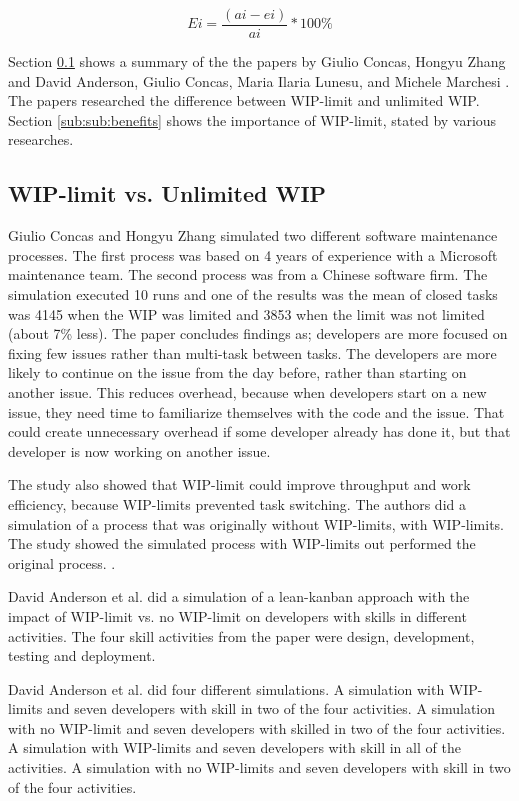 \documentclass[UKenglish]{ifimaster}  %
\begin{document}
\begin{equation} \label{WIPEQ}
Ei=\frac{(ai-ei)}{ai}*100\%
\end{equation}

Section \ref{sub:wip:vs:wip} shows a summary of the the papers by Giulio Concas, Hongyu Zhang \parencite{SMR:SMR1599}  and David Anderson, Giulio Concas, Maria Ilaria Lunesu, and Michele Marchesi \parencite{DavidAnderson}. The papers researched the difference between WIP-limit and unlimited WIP. Section \ref{sub:sub:benefits} shows the importance of WIP-limit, stated by various researches. 

\subsection {WIP-limit vs. Unlimited WIP}
\label{sub:wip:vs:wip}
Giulio Concas and Hongyu Zhang \parencite{SMR:SMR1599} simulated two different software maintenance processes. The first process was based on 4 years of experience with a Microsoft maintenance team. The second process was from a Chinese software firm.  The simulation executed 10 runs and one of the results was the mean of closed tasks was 4145 when the WIP was limited and 3853 when the limit was not limited (about 7\% less). The paper concludes findings as; developers are more focused on fixing few issues rather than multi-task between tasks. The developers are more likely to continue on the issue from the day before, rather than starting on another issue. This reduces overhead, because when developers start on a new issue, they need time to familiarize themselves with the code and the issue. That could create unnecessary overhead if some developer already has done it, but that developer is now working on another issue. 

The study also showed that WIP-limit could improve throughput and work efficiency, because WIP-limits prevented task switching. The authors did a simulation of a process that was originally without WIP-limits, with WIP-limits. The study showed the simulated process with WIP-limits out performed the original process. \parencite{SMR:SMR1599}.

David Anderson et al. \parencite{DavidAnderson} did a simulation of a lean-kanban approach with the impact of WIP-limit vs. no WIP-limit on developers with skills in different activities. The four skill activities from the paper were design, development, testing and deployment. 

David Anderson et al. did four different simulations.  A simulation with WIP-limits and seven developers with skill in two of the four activities. A simulation with no WIP-limit and seven developers with skilled in two of the four activities. A simulation with WIP-limits and seven developers with skill in all of the activities. A simulation with no WIP-limits and seven developers with skill in two of the four activities.
\end{document}
